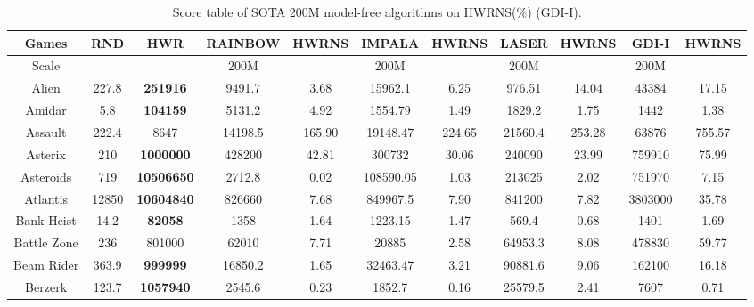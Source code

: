 \documentclass[nohyperref]{article}
\theoremstyle{plain}
\begin{document}
\begin{table}[!hb]
\footnotesize
\begin{center}
\caption{Score table of SOTA 200M model-free algorithms on HWRNS(\%)  (GDI-I).}
\setlength{\tabcolsep}{1.0pt}
\begin{tabular}{|c| c| c| c c| c c| c c| c c| }
\hline
Games               & RND       & HWR       & RAINBOW  & HWRNS & IMPALA  & HWRNS & LASER  & HWRNS & GDI-I & HWRNS  \\
\hline
Scale               &           &           & 200M     &           &  200M   &            & 200M    &           &  200M    &            \\
\hline
 Alien              & 227.8     & \textbf{251916}    & 9491.7   &3.68    & 15962.1    & 6.25       & 976.51  & 14.04     &43384             &17.15     \\
 Amidar             & 5.8       & \textbf{104159}    & 5131.2   &4.92    & 1554.79    & 1.49       & 1829.2  & 1.75      &1442              &1.38           \\
 Assault            & 222.4     & 8647             & 14198.5  &165.90  & 19148.47   & 224.65     & 21560.4 & 253.28    &63876        &755.57  \\
 Asterix            & 210       & \textbf{1000000}   & 428200   &42.81   & 300732     & 30.06      & 240090  & 23.99     &759910            &75.99   \\
 Asteroids          & 719       & \textbf{10506650}  & 2712.8   &0.02    & 108590.05  & 1.03       & 213025  & 2.02      &751970            &7.15   \\
 Atlantis           & 12850     & \textbf{10604840}  & 826660   &7.68    & 849967.5   & 7.90       & 841200  & 7.82      &3803000           &35.78  \\
 Bank Heist         & 14.2      & \textbf{82058}     & 1358     &1.64    & 1223.15    & 1.47       & 569.4   & 0.68      &1401              &1.69    \\
 Battle Zone        & 236       & 801000    & 62010    &7.71    & 20885      & 2.58       & 64953.3 & 8.08      &478830            &59.77 \\
 Beam Rider         & 363.9     & \textbf{999999}    & 16850.2  &1.65    & 32463.47   & 3.21       & 90881.6 & 9.06      &162100            &16.18    \\
 Berzerk            & 123.7     & \textbf{1057940}   & 2545.6   &0.23    & 1852.7     & 0.16       & 25579.5 & 2.41      &7607                       &0.71            \\

\end{tabular}
\end{center}
\end{table}
\end{document}
